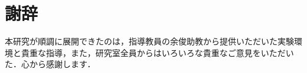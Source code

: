 
\clearpage

\chapter*{謝辞}

本研究が順調に展開できたのは，指導教員の余俊助教から提供いただいた実験環境と貴重な指導，また，研究室全員からはいろいろな貴重なご意見をいただいた．心から感謝します．
